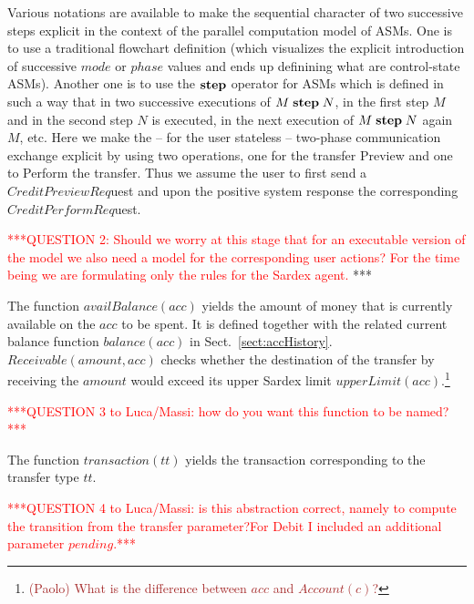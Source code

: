 Various notations are available to make the sequential character of two successive steps explicit in the context of the parallel computation model of ASMs. One is to use a traditional flowchart definition (which visualizes the explicit introduction of successive $mode$ or $phase$ values and ends up definining what are control-state ASMs). Another one is to use the $\mathrel{\mathbf{step}}$ operator for ASMs which is defined in such a way that in two successive executions of $M \mathrel{\mathbf{step}} N$, in the first step $M$ and in the second step $N$ is executed, in the next execution of  $M \mathrel{\mathbf{step}} N $ again $M$, etc. Here we make the -- for the user stateless -- two-phase communication exchange explicit by using two operations, one for the transfer Preview and one to Perform the transfer. Thus we assume the user to first send a $CreditPreviewReq$uest and upon the positive system response the corresponding $CreditPerformReq$uest.


\vspace{12pt}
\textcolor{red}{***QUESTION 2: Should we worry at this stage that for an executable version of the model we also need a model for the corresponding user actions? For the time being we are formulating only the rules for the Sardex agent.}
***
\vspace{12pt}

The function $availBalance(acc)$ yields the amount of money that is currently available on the $acc$ to be spent. It is defined together with the related current balance function $balance(acc)$ in Sect.~\ref{sect:accHistory}. $Receivable(amount,acc)$ checks whether the destination of the transfer by receiving the $amount$ would exceed its upper Sardex limit
$upperLimit(acc)$.\footnote{\textcolor{brown}{(Paolo) What is the difference between $acc$ and $Account(c)$?}}

\vspace{12pt}
\textcolor{red}{
***QUESTION 3 to Luca/Massi: how do you want this function to be named?***}
\vspace{12pt}

The function $transaction(tt)$ yields the transaction corresponding to the transfer type $tt$.

\vspace{12pt}
\textcolor{red}{***QUESTION 4 to Luca/Massi: is this abstraction  correct, namely to compute the transition from the transfer parameter?For Debit I included an additional parameter $pending$.***}
\vspace{12pt}

